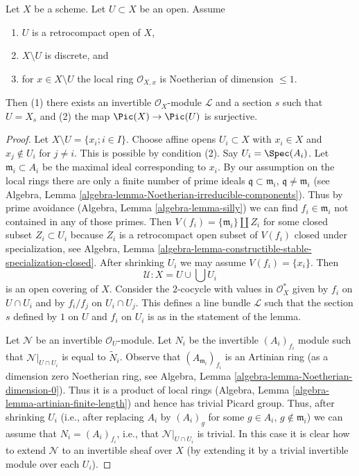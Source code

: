 \begin{lemma}
\label{lemma-complement-codim-1-closed-points}
Let $X$ be a scheme. Let $U \subset X$ be an open. Assume
\begin{enumerate}
\item $U$ is a retrocompact open of $X$,
\item $X \setminus U$ is discrete, and
\item for $x \in X \setminus U$ the local ring
$\mathcal{O}_{X, x}$ is Noetherian of dimension $\leq 1$.
\end{enumerate}
Then (1) there exists an invertible $\mathcal{O}_X$-module $\mathcal{L}$
and a section $s$ such that $U = X_s$ and (2) the map
$\Pic(X) \to \Pic(U)$ is surjective.
\end{lemma}

\begin{proof}
Let $X \setminus U = \{x_i; i \in I\}$.
Choose affine opens $U_i \subset X$ with $x_i \in X$ and
$x_j \not \in U_i$ for $j \not = i$. This is possible by condition (2).
Say $U_i = \Spec(A_i)$. Let $\mathfrak m_i \subset A_i$ be the maximal
ideal corresponding to $x_i$. By our assumption on the local rings
there are only a finite number of prime ideals
$\mathfrak q \subset \mathfrak m_i$,
$\mathfrak q \not = \mathfrak m_i$ (see
Algebra, Lemma \ref{algebra-lemma-Noetherian-irreducible-components}).
Thus by prime avoidance (Algebra, Lemma
\ref{algebra-lemma-silly}) we can find $f_i \in \mathfrak m_i$
not contained in any of those primes. Then
$V(f_i) = \{\mathfrak m_i\} \amalg Z_i$ for some closed subset
$Z_i \subset U_i$ because $Z_i$ is a retrocompact open subset of
$V(f_i)$ closed under specialization, see
Algebra, Lemma \ref{algebra-lemma-constructible-stable-specialization-closed}.
After shrinking $U_i$ we may assume $V(f_i) = \{x_i\}$. Then
$$
\mathcal{U} : X = U \cup \bigcup U_i
$$
is an open covering of $X$. Consider the $2$-cocycle with values
in $\mathcal{O}_X^*$ given by $f_i$ on $U \cap U_i$ and by
$f_i/f_j$ on $U_i \cap U_j$. This defines a line bundle
$\mathcal{L}$ such that the section $s$ defined by $1$ on $U$
and $f_i$ on $U_i$ is as in the statement of the lemma.

\medskip\noindent
Let $\mathcal{N}$ be an invertible $\mathcal{O}_U$-module.
Let $N_i$ be the invertible $(A_i)_{f_i}$ module such that
$\mathcal{N}|_{U \cap U_i}$ is equal to $\tilde N_i$.
Observe that $(A_{\mathfrak m_i})_{f_i}$ is an Artinian ring
(as a dimension zero Noetherian ring, see
Algebra, Lemma \ref{algebra-lemma-Noetherian-dimension-0}).
Thus it is a product of local rings
(Algebra, Lemma \ref{algebra-lemma-artinian-finite-length}) and
hence has trivial Picard group. Thus, after shrinking $U_i$
(i.e., after replacing $A_i$ by $(A_i)_g$ for some $g \in A_i$,
$g \not \in \mathfrak m_i$)
we can assume that $N_i = (A_i)_{f_i}$, i.e., that
$\mathcal{N}|_{U \cap U_i}$ is trivial. In this case it is
clear how to extend $\mathcal{N}$ to an invertible sheaf over $X$
(by extending it by a trivial invertible module over each $U_i$).
\end{proof}

